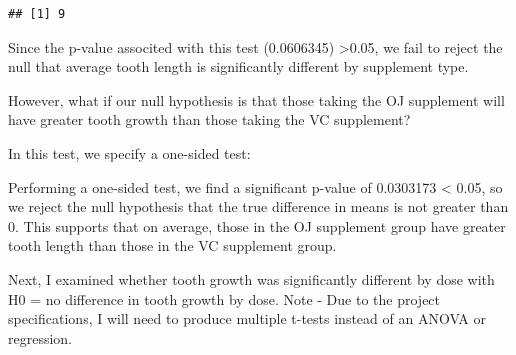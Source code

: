 \documentclass[]{article}
\newenvironment{Shaded}{\begin{snugshade}}{\end{snugshade}}
\newcommand{\KeywordTok}[1]{\textcolor[rgb]{0.13,0.29,0.53}{\textbf{#1}}}
\newcommand{\DataTypeTok}[1]{\textcolor[rgb]{0.13,0.29,0.53}{#1}}
\newcommand{\DecValTok}[1]{\textcolor[rgb]{0.00,0.00,0.81}{#1}}
\newcommand{\StringTok}[1]{\textcolor[rgb]{0.31,0.60,0.02}{#1}}
\newcommand{\CommentTok}[1]{\textcolor[rgb]{0.56,0.35,0.01}{\textit{#1}}}
\newcommand{\OtherTok}[1]{\textcolor[rgb]{0.56,0.35,0.01}{#1}}
\newcommand{\OperatorTok}[1]{\textcolor[rgb]{0.81,0.36,0.00}{\textbf{#1}}}
\newcommand{\NormalTok}[1]{#1}
\begin{document}
\begin{verbatim}
## [1] 9
\end{verbatim}

\begin{Shaded}
\end{Shaded}

Since the p-value associted with this test (0.0606345)
\textgreater{}0.05, we fail to reject the null that average tooth length
is significantly different by supplement type.

However, what if our null hypothesis is that those taking the OJ
supplement will have greater tooth growth than those taking the VC
supplement?

In this test, we specify a one-sided test:

\begin{Shaded}
\end{Shaded}

Performing a one-sided test, we find a significant p-value of 0.0303173
\textless{} 0.05, so we reject the null hypothesis that the true
difference in means is not greater than 0. This supports that on
average, those in the OJ supplement group have greater tooth length than
those in the VC supplement group.

Next, I examined whether tooth growth was significantly different by
dose with H0 = no difference in tooth growth by dose. Note - Due to the
project specifications, I will need to produce multiple t-tests instead
of an ANOVA or regression.
\end{document}
